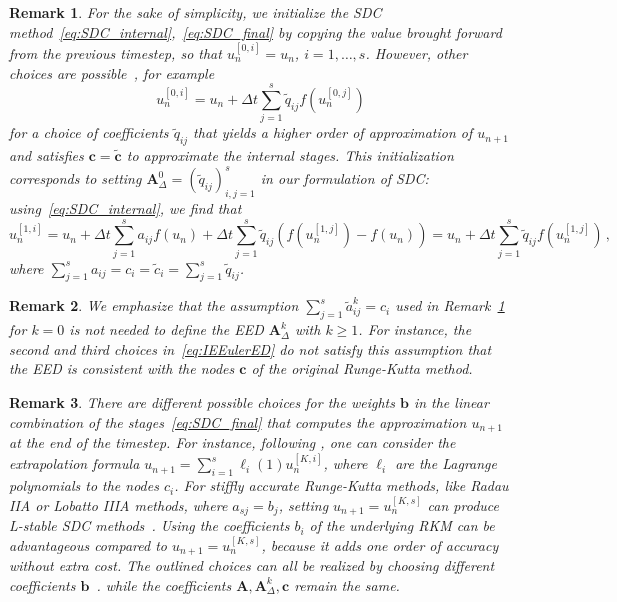 \documentclass[sn-mathphys-num]{sn-jnl}%
\newcommand{\reva}[1]{#1}%
\theoremstyle{thmstyleone}%
\theoremstyle{thmstyletwo}%
\newtheorem{remark}{Remark}%
\theoremstyle{thmstylethree}%
\begin{document}
\begin{remark}
    \label{rmk:init}
    For the sake of simplicity, we initialize the SDC method~\eqref{eq:SDC_internal},~\eqref{eq:SDC_final} by copying the value brought forward from the previous timestep, so that $u^{[0,i]}_n = u_n$, $i = 1, \dots, s$. 
    However, other choices are possible~\citep{Ascher1997}, for example
    \begin{equation*}
        u_n^{[0,i]} = u_n + \Delta t \sum_{j=1}^{s} \tilde{q}_{ij} f(u_n^{[0,j]} )
    \end{equation*}
    for a choice of coefficients $\tilde{q}_{ij}$ that yields a higher order of approximation of $u_{n+1}$ and satisfies $\bm{c} = \tilde{\bm{c}}$ to approximate the internal stages. 
    This initialization corresponds to setting $\bm{A}^0_\Delta = (\tilde{q}_{ij})_{i,j=1}^s$ in our formulation of SDC: using~\eqref{eq:SDC_internal}, we find that
    \begin{equation*}
        u_n^{[1, i]} = u_n + \Delta{t}\sum_{j=1}^{s} a_{ij} f(u_n) + \Delta{t}\sum_{j=1}^{s} \tilde{q}_{ij} (f(u_n^{[1,j]}) - f(u_n)) = u_n + \Delta t \sum_{j=1}^s \tilde{q}_{ij} f(u_n^{[1,j]}) \,,
    \end{equation*}
    where $\sum_{j=1}^{s} a_{ij} = c_i = \tilde{c}_i = \sum_{j=1}^{s} \tilde{q}_{ij}$.
\end{remark}

\begin{remark}
    We emphasize that the assumption $\sum_{j=1}^s \tilde{a}^k_{ij} = c_i$ used in Remark~\ref{rmk:init} for $k = 0$ is not needed to define the EED $\bm{A}^k_\Delta$ with $k \geq 1$. 
    For instance, the second and third choices in~\eqref{eq:IEEulerED} do not satisfy this assumption that the EED is consistent with the nodes $\bm{c}$ of the original Runge-Kutta method.
\end{remark}

\begin{remark}
    \label{rmk:final_update}
    \reva{There are different possible choices for the weights $\bm{b}$ in the linear combination of the stages~\eqref{eq:SDC_final} that computes the approximation $u_{n+1}$ at the end of the timestep. 
    For instance, following \citep[Eq. 4.2]{DuttEtAl2000}, one can consider the extrapolation formula $u_{n+1} = \sum_{i=1}^s \ell_i(1) u_n^{[K,i]}$, where $\ell_i$ are the Lagrange polynomials to the nodes $c_i$.
    For stiffly accurate Runge-Kutta methods,  like Radau IIA or Lobatto IIIA methods, where $a_{sj} = b_j$, setting $u_{n+1} = u_n^{[K,s]}$ can produce L-stable SDC methods~\citep[Theorem 3.1]{LaytonMinion2005}.
    Using the coefficients $b_i$ of the underlying RKM can be advantageous compared to $u_{n+1} = u^{[K,s]}_n$, because it adds one order of accuracy without extra cost. 
    The outlined choices can all be realized by choosing different coefficients $\bm{b}$~\citep{Fregin2026}. while the coefficients $\bm{A}, \bm{A}_\Delta^k, \bm{c}$ remain the same.}
\end{remark}
\end{document}
